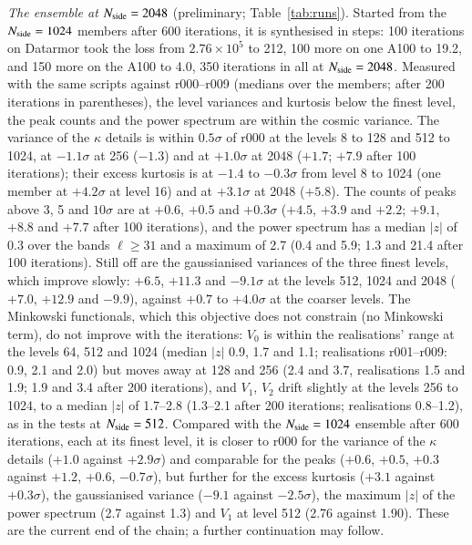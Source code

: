 \documentclass{aa}
\newcommand{\nside}{N_{\rm side}}
\begin{document}
\emph{The ensemble at $\nside=2048$} (preliminary; Table~\ref{tab:runs}). Started from the $\nside=1024$ members after 600 iterations, it is synthesised in steps: 100 iterations on Datarmor took the loss from $2.76\times10^5$ to 212, 100 more on one A100 to 19.2, and 150 more on the A100 to 4.0, 350 iterations in all at $\nside=2048$. Measured with the same scripts against r000--r009 (medians over the members; after 200 iterations in parentheses), the level variances and kurtosis below the finest level, the peak counts and the power spectrum are within the cosmic variance. The variance of the $\kappa$ details is within $0.5\sigma$ of r000 at the levels 8 to 128 and 512 to 1024, at $-1.1\sigma$ at 256 ($-1.3$) and at $+1.0\sigma$ at 2048 ($+1.7$; $+7.9$ after 100 iterations); their excess kurtosis is at $-1.4$ to $-0.3\sigma$ from level 8 to 1024 (one member at $+4.2\sigma$ at level 16) and at $+3.1\sigma$ at 2048 ($+5.8$). The counts of peaks above 3, 5 and $10\sigma$ are at $+0.6$, $+0.5$ and $+0.3\sigma$ ($+4.5$, $+3.9$ and $+2.2$; $+9.1$, $+8.8$ and $+7.7$ after 100 iterations), and the power spectrum has a median $|z|$ of 0.3 over the bands $\ell\geq31$ and a maximum of 2.7 (0.4 and 5.9; 1.3 and 21.4 after 100 iterations). Still off are the gaussianised variances of the three finest levels, which improve slowly: $+6.5$, $+11.3$ and $-9.1\sigma$ at the levels 512, 1024 and 2048 ($+7.0$, $+12.9$ and $-9.9$), against $+0.7$ to $+4.0\sigma$ at the coarser levels. The Minkowski functionals, which this objective does not constrain (no Minkowski term), do not improve with the iterations: $V_0$ is within the realisations' range at the levels 64, 512 and 1024 (median $|z|$ 0.9, 1.7 and 1.1; realisations r001--r009: 0.9, 2.1 and 2.0) but moves away at 128 and 256 (2.4 and 3.7, realisations 1.5 and 1.9; 1.9 and 3.4 after 200 iterations), and $V_1$, $V_2$ drift slightly at the levels 256 to 1024, to a median $|z|$ of 1.7--2.8 (1.3--2.1 after 200 iterations; realisations 0.8--1.2), as in the tests at $\nside=512$. Compared with the $\nside=1024$ ensemble after 600 iterations, each at its finest level, it is closer to r000 for the variance of the $\kappa$ details ($+1.0$ against $+2.9\sigma$) and comparable for the peaks ($+0.6$, $+0.5$, $+0.3$ against $+1.2$, $+0.6$, $-0.7\sigma$), but further for the excess kurtosis ($+3.1$ against $+0.3\sigma$), the gaussianised variance ($-9.1$ against $-2.5\sigma$), the maximum $|z|$ of the power spectrum (2.7 against 1.3) and $V_1$ at level 512 (2.76 against 1.90). These are the current end of the chain; a further continuation may follow. %
\end{document}
